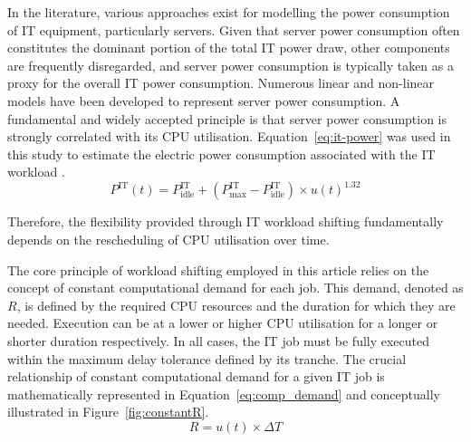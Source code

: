  In the literature, various approaches exist for modelling the power consumption of IT equipment, particularly servers. Given that server power consumption often constitutes the dominant portion of the total IT power draw, other components are frequently disregarded, and server power consumption is typically taken as a proxy for the overall IT power consumption. Numerous linear and non-linear models have been developed to represent server power consumption. A fundamental and widely accepted principle is that server power consumption is strongly correlated with its CPU utilisation.  Equation~\ref{eq:it-power} was used in this study to estimate the electric power consumption associated with the IT workload \cite{dayarathna2015data,v2015analysis}.
\begin{equation}
P^{\mathrm{IT}}(t) = P^{\mathrm{IT}}_{\mathrm{idle}} + (P^{\mathrm{IT}}_{\mathrm{max}} - P^{\mathrm{IT}}_{\mathrm{idle}}) \times u(t)^{1.32}
\label{eq:it-power}
\end{equation}



Therefore, the flexibility provided through IT workload shifting fundamentally depends on the rescheduling of CPU utilisation over time.

The core principle of workload shifting employed in this article relies on the concept of constant computational demand for each job. This demand, denoted as $R$, is defined by the required CPU resources and the duration for which they are needed.  Execution can be at a lower or higher CPU utilisation for a longer or shorter duration respectively. In all cases, the IT job must be fully executed within the maximum delay tolerance defined by its tranche. The crucial relationship of constant computational demand for a given IT job is mathematically represented in Equation~\ref{eq:comp_demand} and conceptually illustrated in Figure~\ref{fig:constantR}.
\begin{equation}
R = u(t) \times \Delta T
\label{eq:comp_demand}
\end{equation}

